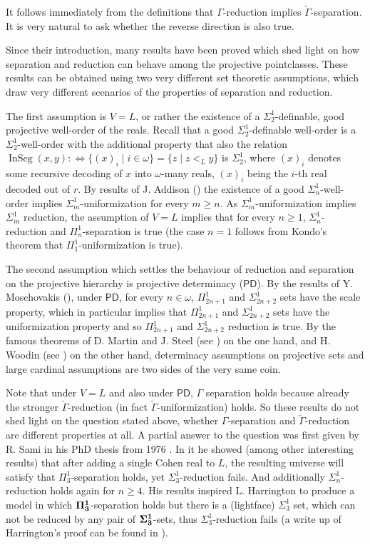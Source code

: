 \documentclass[a4paper,11pt]{article}
\newcommand{\PD}{\mathsf{PD}}
\begin{document}
It follows immediately from the definitions that $\Gamma$-reduction implies $\check{\Gamma}$-separation. It is very natural to ask whether the reverse direction is also true.

Since their introduction, many results have been proved which shed light on how  separation and reduction can behave among the projective pointclasses. These results can be obtained using two very different set theoretic assumptions, which draw very different scenarios of the properties of separation and reduction.

The first assumption is $V=L$, or rather the existence of a $\Sigma^1_2$-definable, good projective well-order of the reals. Recall that a good $\Sigma^1_2$-definable well-order is a $\Sigma^1_2$-well-order with the additional property that 
also the relation $\operatorname{InSeg} (x,y) :\Leftrightarrow \{ (x)_i \mid i \in \omega \} = \{z  \mid z <_L y \}$ is $\Sigma^1_2$, where $(x)_i$ denotes some recursive decoding of $x$ into $\omega$-many reals, $(x)_i$ being the $i$-th real decoded out of $r$. By results of J. Addison (\cite{Addison}) the existence of a good $\Sigma^1_n$-well-order implies $\Sigma^1_m$-uniformization for every $m \ge n$. As $\Sigma^1_m$-uniformization implies $\Sigma^1_m$ reduction, the assumption of $V=L$ implies that for every $n \ge 1$, $\Sigma^1_n$-reduction and $\Pi^1_n$-separation is true (the case $n=1$ follows from Kondo's theorem that $\Pi^1_1$-uniformization is true).

The second assumption which settles the behaviour of reduction and separation on the projective hierarchy is projective determinacy ($\mathsf{PD}$). By the results of Y. Moschovakis (\cite{Moschovakis2}), under $\mathsf{PD}$, for every $n \in \omega$, $\Pi^1_{2n+1}$ and $\Sigma^1_{2n+2}$ sets have the scale property, which in particular implies that $\Pi^1_{2n+1}$ and $\Sigma^1_{2n+2}$ sets have the uniformization property and so $\Pi^1_{2n+1}$ and $\Sigma^1_{2n+2}$ reduction is true. By the famous theorems of D. Martin and J. Steel (see \cite{MS}) on the one hand, and H. Woodin (see \cite {MSW}) on the other hand, determinacy assumptions on projective sets and large cardinal assumptions are two sides of the very same coin.



Note that under $V=L$ and also under $\PD$, $\Gamma$ separation holds because already the stronger $\check{\Gamma}$-reduction (in fact $\check{\Gamma}$-uniformization) holds. So these results do not 
shed light on the question stated above, whether $\Gamma$-separation and $\check{\Gamma}$-reduction are different properties at all. A partial answer to the question was first given by R. Sami in his PhD thesis from 1976 \cite{Sami}. In it he showed (among other interesting results) that
after adding a single Cohen real to $L$, the resulting universe will satisfy that
$\Pi^1_3$-separation holds, yet $\Sigma^1_3$-reduction fails. And additionally $\Sigma^1_n$-reduction holds again for $n \ge 4$. His results inspired L. Harrington to produce a model in which $\bf{\Pi}^1_3$-separation holds but there
is a (lightface) $\Sigma^1_3$ set, which can not be reduced by any pair of $\bf{\Sigma}^1_3$-sets, thus $\Sigma^1_3$-reduction fails (a write up of Harrington's proof can be found in \cite{KL}).
\end{document}
